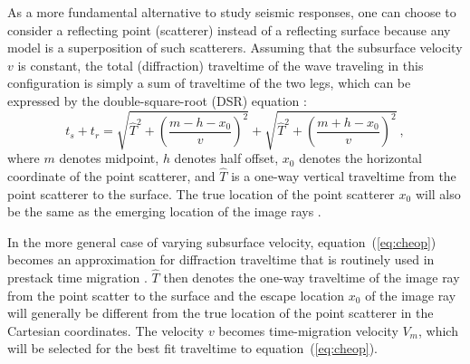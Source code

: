 As a more fundamental alternative to study seismic responses, one can choose to consider a reflecting point (scatterer) instead of a reflecting surface because any model is a superposition of such scatterers. Assuming that the subsurface velocity $v$ is constant, the total (diffraction) traveltime of the wave traveling in this configuration is simply a sum of traveltime of the two legs, which can be expressed by the double-square-root (DSR) equation \cite[]{bei}:
\begin{equation}
\label{eq:cheop}
t_s + t_r = \sqrt{\hat{T}^2 + \left(\frac{m-h-x_0}{v}\right)^2} + \sqrt{\hat{T}^2 + \left(\frac{m+h-x_0}{v}\right)^2}~,
\end{equation}
where $m$ denotes midpoint, $h$ denotes half offset, $x_0$ denotes the horizontal coordinate of the point scatterer, and $\hat{T}$ is a one-way vertical traveltime from the point scatterer to the surface. The true location of the point scatterer $x_0$ will also be the same as the emerging location of the image rays \cite[]{hubralimageray}.

In the more general case of varying subsurface velocity, equation~(\ref{eq:cheop}) becomes an approximation for diffraction traveltime that is routinely used in prestack time migration \cite[]{yilmaz}. $\hat{T}$ then denotes the one-way traveltime of the image ray from the point scatter to the surface and the escape location $x_0$ of the image ray will generally be different from the true location of the point scatterer in the Cartesian coordinates. The velocity $v$ becomes time-migration velocity $V_m$, which will be selected for the best fit traveltime to equation~(\ref{eq:cheop}).


